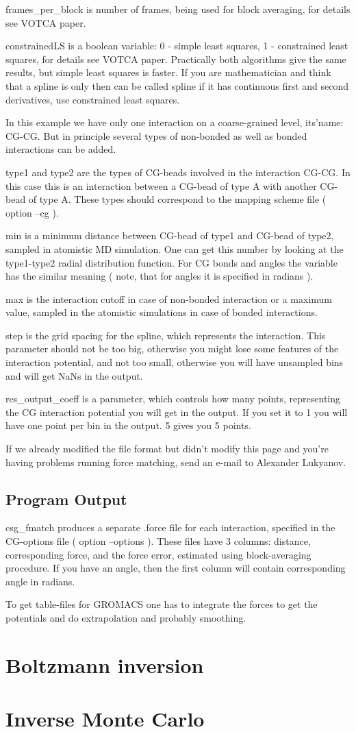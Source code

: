frames\_per\_block is number of frames, being used for block averaging, for details see VOTCA paper.

constrainedLS is a boolean variable: 0 - simple least squares, 1 - constrained least squares, for details see VOTCA paper.
Practically both algorithms give the same results, but simple least squares is faster. If you are mathematician and think that a spline is only then can be called spline if it has continuous first and second derivatives, use constrained least squares.

In this example we have only one interaction on a coarse-grained level, its'name: CG-CG. But in principle several types of non-bonded as well as bonded interactions can be added. 

type1 and type2 are the types of CG-beads involved in the interaction CG-CG. In this case this is an interaction between a CG-bead of type A with another CG-bead of type A. These types should correspond to the mapping scheme file ( option --cg ).

min is a minimum distance between CG-bead of type1 and CG-bead of type2,  sampled in atomistic MD simulation. One can get this number by looking at the type1-type2 radial distribution function. For CG bonds and angles the variable has the similar meaning ( note, that for angles it is specified in radians ).

max is the interaction cutoff in case of non-bonded interaction or a maximum value, sampled in the atomistic simulations in case of bonded interactions.

step is the grid spacing for the spline, which represents the interaction. This parameter should not be too big, otherwise you might lose some features of the interaction potential, and not too small, otherwise you will have unsampled bins and will get NaNs in the output.

res\_output\_coeff is a parameter, which controls how many points, representing the CG interaction potential you will get in the output. If you set it to 1 you will have one point per bin in the output. 5 gives you 5 points.

If we already modified the file format but didn't modify this page and you're having problems running force matching, send an e-mail to Alexander Lukyanov.

\subsection{Program Output}
csg\_fmatch produces a separate .force file for each interaction, specified in the CG-options file ( option --options ).
These files have 3 columns: distance, corresponding force, and the force error, estimated using block-averaging procedure.
If you have an angle, then the first column will contain corresponding angle in radians.

To get table-files for GROMACS one has to integrate the forces to get the potentials and do extrapolation and probably smoothing.

\section{Boltzmann inversion}

\section{Inverse Monte Carlo}

